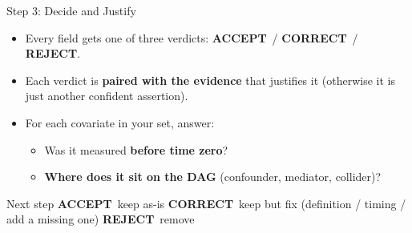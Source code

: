 \documentclass[aspectratio=169]{beamer}
\newcommand{\vaccept}{\textcolor{good}{\textbf{ACCEPT}}}
\newcommand{\vcorrect}{\textcolor{accent}{\textbf{CORRECT}}}
\newcommand{\vreject}{\textcolor{brick}{\textbf{REJECT}}}
\begin{document}
\begin{frame}{Step 3: Decide and Justify}
  \small
  \begin{itemize}
    \item Every field gets one of three verdicts: \vaccept\ / \vcorrect\ / \vreject.
    \item Each verdict is \textbf{paired with the evidence} that justifies it (otherwise
      it is just another confident assertion).
    \item For each covariate in your set, answer:
      \begin{itemize}
        \item Was it measured \textbf{before time zero}?
        \item \textbf{Where does it sit on the DAG} (confounder, mediator, collider)?
      \end{itemize}
  \end{itemize}
  \vspace{0.5em}

  \begin{block}{Next step}
    \vaccept\ keep as-is \quad
    \vcorrect\ keep but fix (definition / timing / add a missing one) \quad
    \vreject\ remove
  \end{block}
\end{frame}
\end{document}
